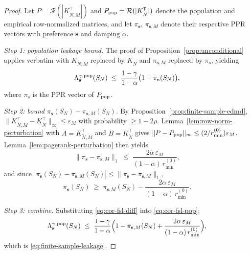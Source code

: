 \documentclass{article}
\theoremstyle{plain}
\theoremstyle{definition}
\def\tp{\intercal}
\newcommand{\arXivtag}[1][]{#1}
\begin{document}
\begin{proof}%
	Let \arXivtag[$P = \mathcal{R}(|K_{\tilde{N},M}^\tp|)$ and $P_{\textnormal{pop}} = \mathcal{R}(|K_{\tilde{N}}^\tp|)$] denote the population and empirical row-normalized matrices, and let $\pi_{\mathbf{s}}$, $\pi_{\mathbf{s}, M}$ denote their respective PPR vectors with preference $\mathbf{s}$ and damping $\alpha$.
	
	\emph{Step 1: population leakage bound.} The proof of Proposition~\ref{prop:unconditional} applies verbatim with $K_{\tilde{N},M}$ replaced by $K_{\tilde{N}}$ and \arXivtag[$\pi_{\mathbf{s}, M}$ replaced by $\pi_{\mathbf{s}}$], yielding
	\begin{equation}\label{eq:cor-fsl-pop}
		\Lambda_{\mathbf{s}}^{\gamma,\textnormal{pop}}(S_N) \;\leq\; \frac{1-\gamma}{1-\alpha}\bigl(1 - \pi_{\mathbf{s}}(S_N)\bigr),
	\end{equation}
	where $\pi_{\mathbf{s}}$ is the PPR vector of $P_{\textnormal{pop}}$.
	
	\emph{Step 2: bound $\pi_{\mathbf{s}}(S_N) - \pi_{\mathbf{s}, M}(S_N)$.} By Proposition~\ref{prop:finite-sample-edmd}, $\|K_{\tilde{N},M}^\tp - K_{\tilde{N}}^\tp\|_\infty \leq \varepsilon_M$ with probability $\geq 1-2\rho$. Lemma~\ref{lem:row-norm-perturbation} with \arXivtag[$A = K_{\tilde{N},M}^\tp$ and $B = K_{\tilde{N}}^\tp$] gives $\|P - P_{\textnormal{pop}}\|_\infty \leq (2/r^{(0)}_{\min})\varepsilon_M$. Lemma~\ref{lem:pagerank-perturbation} then yields
	\begin{equation}\label{eq:cor-fsl-ppr}
		\|\pi_{\mathbf{s}} - \pi_{\mathbf{s}, M}\|_1 \;\leq\; \frac{2\alpha\,\varepsilon_M}{(1-\alpha)\,r^{(0)}_{\min}},
	\end{equation}
	and since $|\pi_{\mathbf{s}}(S_N) - \pi_{\mathbf{s}, M}(S_N)| \leq \|\pi_{\mathbf{s}} - \pi_{\mathbf{s}, M}\|_1$,
	\begin{equation}\label{eq:cor-fsl-diff}
		\pi_{\mathbf{s}}(S_N) \;\geq\; \pi_{\mathbf{s}, M}(S_N) - \frac{2\alpha\,\varepsilon_M}{(1-\alpha)\,r^{(0)}_{\min}}.
	\end{equation}
	
	\emph{Step 3: combine.} Substituting \eqref{eq:cor-fsl-diff} into \eqref{eq:cor-fsl-pop}:
	\begin{equation*}
		\Lambda_{\mathbf{s}}^{\gamma,\textnormal{pop}}(S_N) \;\leq\; \frac{1-\gamma}{1-\alpha}\Bigl(1 - \pi_{\mathbf{s}, M}(S_N) + \frac{2\alpha\,\varepsilon_M}{(1-\alpha)\,r^{(0)}_{\min}}\Bigr),
	\end{equation*}
	which is \eqref{eq:finite-sample-leakage}.
\end{proof}
\end{document}
